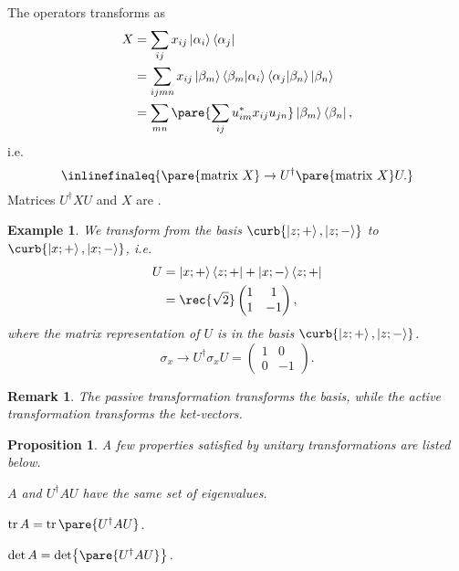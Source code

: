 \documentclass[hidelinks]{article}
\newtheorem{example}{Example}
\newtheorem{remark}{Remark}
\newtheorem{proposition}{Proposition}
\begin{document}
The operators transforms as
\begin{align*}
    X &= \sum_{ij} x_{ij} \ket{\alpha_i}\bra{\alpha_j} \\
    &= \sum_{ijmn} x_{ij} \ket{\beta_m}\bra{\beta_m}\ket{\alpha_i}\bra{\alpha_j}\ket{\beta_n}\ket{\beta_n} \\
    &= \sum_{mn} \pare{\sum_{ij} u^*_{im} x_{ij} u_{jn}} \ket{\beta_m}\bra{\beta_n},
\end{align*}
i.e.
\begin{equation}
    \label{eq:operator_unitary_transform}
    \inlinefinaleq{\pare{\mathrm{matrix\ }X} \rightarrow U^\dagger \pare{\mathrm{matrix\ }X} U.}
\end{equation}
Matrices $U^\dagger X U$ and $X$ are .
\begin{sample}
    \begin{example}
        We transform from the basis $\curb{\ket{z;+},\ket{z;-}}$ to $\curb{\ket{x;+},\ket{x;-}}$, i.e.
        \begin{align*}
            U &= \ket{x;+}\bra{z;+} + \ket{x;-}\bra{z;+} \\
            &= \rec{\sqrt{2}}\begin{pmatrix}
                1 & 1 \\
                1 & -1
            \end{pmatrix},
        \end{align*}
        where the matrix representation of $U$ is in the basis $\curb{\ket{z;+},\ket{z;-}}$.
        \[ \sigma_x \rightarrow U^\dagger \sigma_x U = \begin{pmatrix}
            1 & 0 \\
            0 & -1
        \end{pmatrix}. \]
    \end{example}
\end{sample}
\begin{remark}
    The passive transformation transforms the basis, while the active transformation transforms the ket-vectors.
\end{remark}
\begin{proposition}
    A few properties satisfied by unitary transformations are listed below.
    \begin{cenum}
        \item $A$ and $U^\dagger A U$ have the same set of eigenvalues.
        \item $\trace A = \trace \pare{U^\dagger A U}$.
        \item $\det A = \det\pare{U^\dagger AU}$.
    \end{cenum}
\end{proposition}
\end{document}

